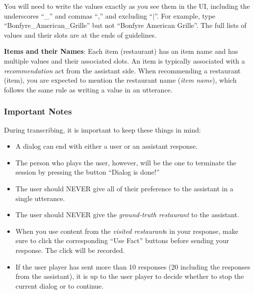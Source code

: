 \documentclass[11pt,a4paper]{article}
\makeatletter
\DeclareRobustCommand\onedot{\futurelet\@let@token\@onedot}
\def\onedot{. }
\def\eg{\emph{e.g}\onedot} \def\Eg{\emph{E.g}\onedot}
\makeatother
\begin{document}
You will need to write the values exactly as you see them in the UI, including the underscores ``\_'' and commas ``,'' and excluding ``$\vert$''. 
For example, type ``Bonfyre\_American\_Grille'' but not ``Bonfyre American Grille''.
The full lists of values and their slots are at the ends of guidelines. %

\noindent \textbf{Items and their Names}: Each item (restaurant) has an item name and has multiple values and their associated slots. An item is typically associated with a \textit{recommendation} act from the assistant side. 
When recommending a restaurant (item), you are expected to mention the restaurant name (\textit{item name}), which follows the same rule as writing a value in an utterance.

\subsubsection{Important Notes}
During transcribing, it is important to keep these things in mind:
\begin{itemize}
\itemsep0em
    \item A dialog can end with either a user or an assistant response.
    \item The person who plays the user, however, will be the one to terminate the session by pressing the button ``Dialog is done!''
    \item The user should NEVER give all of their preference to the assistant in a single utterance.
    \item The user should NEVER give the \textit{ground-truth restaurant} to the assistant.
    \item When you use content from the \textit{visited restaurant}s in your response, make sure to click the corresponding ``Use Fact'' buttons before sending your response. The click will be recorded.
    \item If the user player has sent more than 10 responses (20 including the responses from the assistant),  it is up to the user player to decide whether to stop the current dialog or to continue.
\end{itemize}
\end{document}
